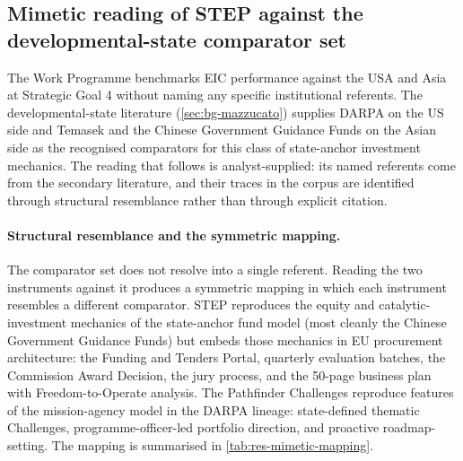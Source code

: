 \subsection{Mimetic reading of STEP against the developmental-state
comparator set}
\label{sec:res-step-mimesis}

The Work Programme benchmarks EIC performance against the USA and
Asia at Strategic Goal 4 without naming any specific institutional
referents. The developmental-state literature (\cref{sec:bg-mazzucato})
supplies DARPA on the US side and Temasek and the Chinese Government
Guidance Funds on the Asian side as the recognised comparators for
this class of state-anchor investment mechanics. The reading that
follows is analyst-supplied: its named referents come from the
secondary literature, and their traces in the corpus are identified
through structural resemblance rather than through explicit citation.

\paragraph{Structural resemblance and the symmetric mapping.}
The comparator set does not resolve into a single referent. Reading the
two instruments against it produces a symmetric mapping in which each
instrument resembles a different comparator. STEP reproduces the equity
and catalytic-investment mechanics of the state-anchor fund model
(most cleanly the Chinese Government Guidance Funds) but embeds those
mechanics in EU procurement architecture: the Funding and Tenders
Portal, quarterly evaluation batches, the Commission Award Decision,
the jury process, and the 50-page business plan with Freedom-to-Operate
analysis. The Pathfinder Challenges reproduce features of the
mission-agency model in the DARPA lineage: state-defined thematic
Challenges, programme-officer-led portfolio direction, and
proactive roadmap-setting. The mapping is summarised in
\cref{tab:res-mimetic-mapping}.


